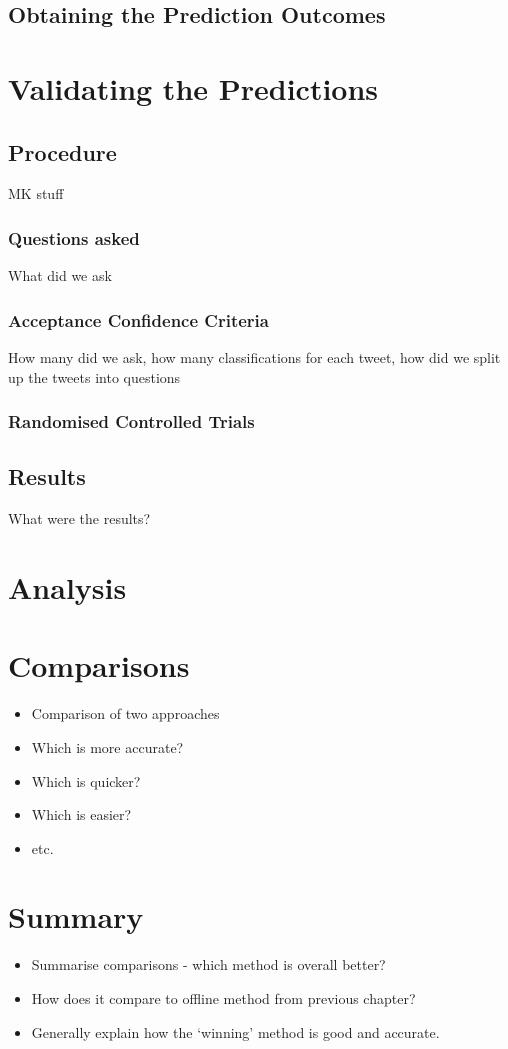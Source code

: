 \subsection{Obtaining the Prediction Outcomes}

\section{Validating the Predictions}
\subsection{Procedure}
MK stuff
\subsubsection{Questions asked}
What did we ask
\subsubsection{Acceptance Confidence Criteria}
How many did we ask, how many classifications for each tweet, how did we split up the tweets into questions
\subsubsection{Randomised Controlled Trials}

\subsection{Results}
What were the results?

\section{Analysis}

\section{Comparisons}
\begin{itemize}
\item Comparison of two approaches
\item Which is more accurate?
\item Which is quicker?
\item Which is easier?
\item etc.
\end{itemize}

\section{Summary}
\begin{itemize}
\item Summarise comparisons - which method is overall better?
\item How does it compare to offline method from previous chapter?
\item Generally explain how the `winning' method is good and accurate.
\end{itemize}